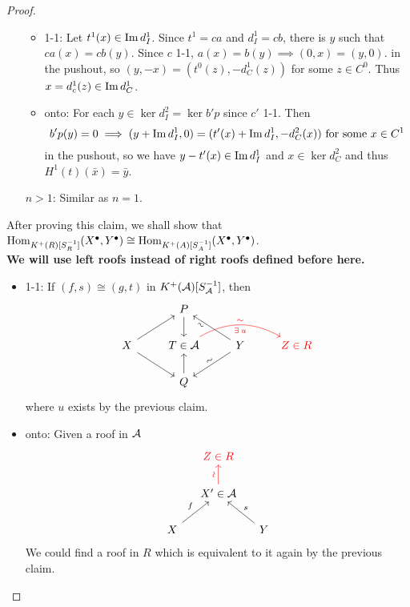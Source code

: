 \begin{theorem}
\begin{proof}
\begin{enumerate}
      \begin{itemize}
        \item 1-1: Let $t^1(x) \in \operatorname{Im} d^1_I$. Since $t^1 = ca$
          and $d^1_I = cb$, there is $y$ such that
          $ca(x) = cb(y)$. Since $c$ 1-1, $a(x) = b(y) \implies (0, x) = (y, 0)$.
          in the pushout, so $(y, -x) = (t^0(z), -d^1_C(z))$ for some $z \in C^0$.
          Thus $x = d^1_c(z) \in \operatorname{Im} d^1_C$.
        \item onto: For each $y \in \ker d_I^2 = \ker b'p$ since $c'$ 1-1.
          Then
          \[ b'p(y) = 0 \implies (y + \operatorname{Im} d^1_I, 0) = (t'(x) + \operatorname{Im} d^1_I, -d^2_C(x))
            \text{ for some } x \in C^1 \]
          in the pushout, so we have $y - t'(x) \in \operatorname{Im} d^1_I$ and
          $ x \in \ker d^2_C$ and thus $H^1(t)(\bar{x}) = \bar{y}$.
      \end{itemize}
    \item[$n > 1$:] Similar as $n = 1$.
    \end{enumerate}
    \medskip

    After proving this claim, we shall show that
    $\operatorname{Hom}_{K^+(R)[S_R^{-1}]}(X^\bullet, Y^\bullet)
    \cong \operatorname{Hom}_{K^+(A)[S^{-1}_A]}(X^\bullet, Y^\bullet)$. \\
    {\bf We will use left roofs instead of right roofs defined before here.}
    \begin{itemize}
      \item 1-1: If $(f, s) \cong (g, t)$ in $K^+(\mathcal{A})[S^{-1}_{\mathcal{A}}]$, then
        \[ \begin{tikzcd}
            & P \ar[d] & & \\
          X \ar[ru] \ar[rd] & T \in \Ac \ar[rr, bend left, "\sim", "\exists u"', sloped, red] &
          Y \ar[lu, "\sim"', sloped, near end] \ar[ld, "\sim", sloped] & {\color{red} Z \in R} \\
          & Q \ar[u] & &
        \end{tikzcd} \]
      where $u$ exists by the previous claim.
      \item onto: Given a roof in $\mathcal{A}$
        \[ \begin{tikzcd}[column sep=small]
            & {\color{red} Z \in R} & \\
            & X' \in \Ac \ar[u, "\rotatebox{90}{\(\sim\)}", red] & \\
            X \ar[ru, "f"] & & Y \ar[lu, "s"']
        \end{tikzcd} \]
      We could find a roof in $R$ which is equivalent to it again
      by the previous claim.
    \end{itemize}
  \end{proof}
\end{theorem}

